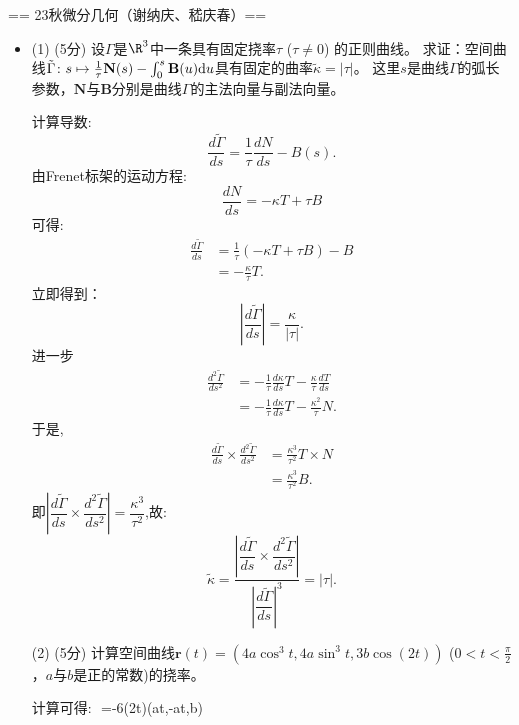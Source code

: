== 23秋微分几何（谢纳庆、嵇庆春）==
\begin{itemize}
    \item[一] (1) (5分) 设$\Gamma$是$\R^3$中一条具有固定挠率$\tau$ ($\tau\ne0$) 的正则曲线。
    求证：空间曲线$\tilde{\Gamma} \colon s\mapsto\frac{1}{\tau}\mathbf{N}(s)
    -\int_0^s\mathbf{B}(u){\rm d}u$具有固定的曲率$\tilde{\kappa}=|\tau|$。
    这里$s$是曲线$\Gamma$的弧长参数，$\mathbf{N}$与$\mathbf{B}$分别是曲线$\Gamma$的主法向量与副法向量。\\
    \begin{proofc}[解]
        计算导数:
			$$
			\frac{d\widetilde{\Gamma}}{ds}=\frac{1}{\tau}\frac{dN}{ds}-B(s).
			$$
			由Frenet标架的运动方程:
			$$
			\frac{dN}{ds}=-\kappa T+\tau B
			$$
			可得:
			\begin{align*}
				\frac{d\widetilde{\Gamma}}{ds}&=\frac{1}{\tau}(-\kappa T+\tau B)-B\\
				&=-\frac{\kappa}{\tau}T.
			\end{align*}
			立即得到：
			$$
			\left|\frac{d\widetilde{\Gamma}}{ds}\right|=\frac{\kappa}{|\tau|}.
			$$
			进一步
			\begin{align*}
				\frac{d^{2}\widetilde{\Gamma}}{ds^{2}}&=-\frac{1}{\tau}\frac{d \kappa}{ds}T-\frac{\kappa}{\tau}\frac{dT}{ds}\\
				&=-\frac{1}{\tau}\frac{d \kappa}{ds}T-\frac{\kappa^{2}}{\tau}N.
			\end{align*}
			于是,
			\begin{align*}
				\frac{d\widetilde{\Gamma}}{ds}\times\frac{d^{2}\widetilde{\Gamma}}{ds^{2}}&=\frac{\kappa^{3}}{\tau^{2}}T\times N\\
				&=\frac{\kappa^{3}}{\tau^{2}}B.
			\end{align*}
			即$\left|\dfrac{d\widetilde{\Gamma}}{ds}\times\dfrac{d^{2}\widetilde{\Gamma}}{ds^{2}}\right|=\dfrac{\kappa^{3}}{\tau^{2}}$,故:
			$$
			\tilde{\kappa}=\frac{\left|\dfrac{d\widetilde{\Gamma}}{ds}\times\dfrac{d^{2}\widetilde{\Gamma}}{ds^{2}}\right|}{\left|\dfrac{d\widetilde{\Gamma}}{ds}\right|^{3}}=|\tau|.
			$$
    \end{proofc}
    (2) (5分) 计算空间曲线$\boldsymbol{r}(t)=(4a\cos^3t,4a\sin^3t,3b\cos(2t))$
    ($0<t<\frac{\pi}{2}$，$a$与$b$是正的常数)的挠率。
    \begin{proofc}[解]
        计算可得:
        $$
            =-6\sin(2t)(a\cos t,-a\sin t,b)\\


\end{proofc}
\end{itemize}
